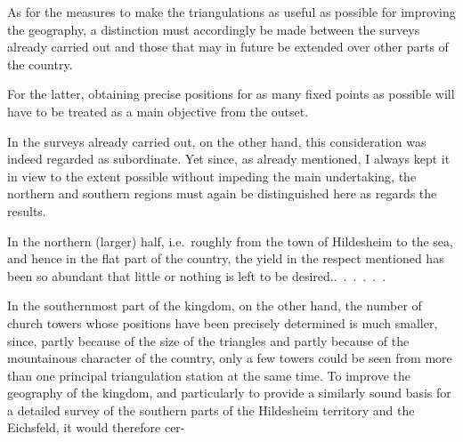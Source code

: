 As for the measures to make the triangulations as useful as possible for
improving the geography, a distinction must accordingly be made between the
surveys already carried out and those that may in future be extended over
other parts of the country.

For the latter, obtaining precise positions for as many fixed points as
possible will have to be treated as a main objective from the outset.

In the surveys already carried out, on the other hand, this consideration
was indeed regarded as subordinate. Yet since, as already mentioned, I always
kept it in view to the extent possible without impeding the main undertaking,
the northern and southern regions must again be distinguished here as regards
the results.

In the northern (larger) half, i.e.\ roughly from the town of Hildesheim to
the sea, and hence in the flat part of the country, the yield in the respect
mentioned has been so abundant that little or nothing is left to be desired.\quad\mbox{.\ .\ .\ .\ .\ .}

In the southernmost part of the kingdom, on the other hand, the number of
church towers whose positions have been precisely determined is much smaller,
since, partly because of the size of the triangles and partly because of the
mountainous character of the country, only a few towers could be seen from
more than one principal triangulation station at the same time. To improve the geography of
the kingdom, and particularly to provide a similarly sound basis for a detailed
survey of the southern parts of the Hildesheim territory and the Eichsfeld,
it would therefore \mbox{cer-}
\par
